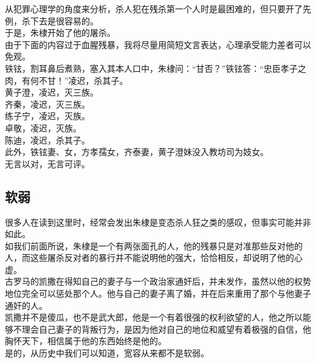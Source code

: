 \begin{multicols}{\theparacolNo}
从犯罪心理学的角度来分析，杀人犯在残杀第一个人时是最困难的，但只要开了先例，杀下去是很容易的。\\

于是，朱棣开始了他的屠杀。\\

由于下面的内容过于血腥残暴，我将尽量用简短文言表达，心理承受能力差者可以免观。\\

铁铉，割耳鼻后煮熟，塞入其本人口中，朱棣问：“甘否？”铁铉答：“忠臣孝子之肉，有何不甘！”凌迟，杀其子。\\

黄子澄，凌迟，灭三族。\\

齐秦，凌迟，灭三族。\\

练子宁，凌迟，灭族。\\

卓敬，凌迟，灭族。\\

陈迪，凌迟，杀其子。\\

此外，铁铉妻、女，方孝孺女，齐泰妻，黄子澄妹没入教坊司为妓女。\\

无言以对，无言可评。\\

\subsection{软弱}
很多人在读到这里时，经常会发出朱棣是变态杀人狂之类的感叹，但事实可能并非如此。\\

如我们前面所说，朱棣是一个有两张面孔的人，他的残暴只是对准那些反对他的人，而这些屠杀反对者的暴行并不能说明他的强大，恰恰相反，却说明了他的心虚。\\

古罗马的凯撒在得知自己的妻子与一个政治家通奸后，并未发作，虽然以他的权势地位完全可以惩处那个人。他与自己的妻子离了婚，并在后来重用了那个与他妻子通奸的人。\\

凯撒并不是傻瓜，也不是武大郎，他是一个有着很强的权利欲望的人，他之所以能够不理会自己妻子的背叛行为，是因为他对自己的地位和威望有着极强的自信，他胸怀天下，相信属于他的东西始终是他的。\\

是的，从历史中我们可以知道，宽容从来都不是软弱。\\


\end{multicols}

